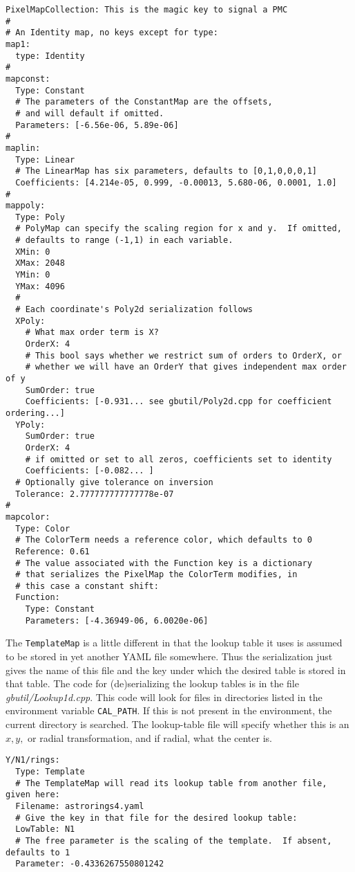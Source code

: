 \documentclass[11pt,preprint,flushrt]{aastex}
\begin{document}
\begin{verbatim}
PixelMapCollection: This is the magic key to signal a PMC
#
# An Identity map, no keys except for type:
map1:
  type: Identity
# 
mapconst:
  Type: Constant
  # The parameters of the ConstantMap are the offsets,
  # and will default if omitted.
  Parameters: [-6.56e-06, 5.89e-06]
#
maplin:
  Type: Linear
  # The LinearMap has six parameters, defaults to [0,1,0,0,0,1]
  Coefficients: [4.214e-05, 0.999, -0.00013, 5.680-06, 0.0001, 1.0]
#
mappoly:
  Type: Poly
  # PolyMap can specify the scaling region for x and y.  If omitted,
  # defaults to range (-1,1) in each variable.
  XMin: 0
  XMax: 2048
  YMin: 0
  YMax: 4096
  #
  # Each coordinate's Poly2d serialization follows
  XPoly:
    # What max order term is X?
    OrderX: 4
    # This bool says whether we restrict sum of orders to OrderX, or 
    # whether we will have an OrderY that gives independent max order of y
    SumOrder: true
    Coefficients: [-0.931... see gbutil/Poly2d.cpp for coefficient ordering...]
  YPoly:
    SumOrder: true
    OrderX: 4
    # if omitted or set to all zeros, coefficients set to identity 
    Coefficients: [-0.082... ]
  # Optionally give tolerance on inversion
  Tolerance: 2.777777777777778e-07
#
mapcolor:
  Type: Color
  # The ColorTerm needs a reference color, which defaults to 0
  Reference: 0.61
  # The value associated with the Function key is a dictionary
  # that serializes the PixelMap the ColorTerm modifies, in
  # this case a constant shift:
  Function:
    Type: Constant
    Parameters: [-4.36949-06, 6.0020e-06]
\end{verbatim}

The \texttt{TemplateMap} is a little different in that the lookup table it uses is assumed to be stored in yet another YAML file somewhere.  Thus the serialization just gives the name of this file and the key under which the desired table is stored in that table.  The code for (de)serializing the lookup tables is in the file \textit{gbutil/Lookup1d.cpp}.  This code will look for files in directories listed in the environment variable \texttt{CAL\_PATH}.  If this is not present in the environment, the current directory is searched.  The lookup-table file will specify whether this is an $x, y,$ or radial transformation, and if radial, what the center is. 
\begin{verbatim}
Y/N1/rings:
  Type: Template
  # The TemplateMap will read its lookup table from another file, given here:
  Filename: astrorings4.yaml
  # Give the key in that file for the desired lookup table:
  LowTable: N1
  # The free parameter is the scaling of the template.  If absent, defaults to 1
  Parameter: -0.4336267550801242
\end{verbatim}
\end{document}
